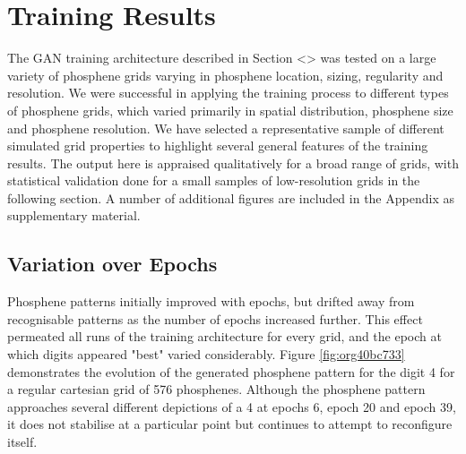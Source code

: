 \documentclass[a4paper,11pt,openany]{book}
\begin{document}
\chapter{Training Results}
\label{sec:org4732778}

The GAN training architecture described in Section <> was tested on a large variety of phosphene grids varying in phosphene location, sizing, regularity and resolution.
We were successful in applying the training process to different types of phosphene grids, which varied primarily in spatial distribution, phosphene size and phosphene resolution.
We have selected a representative sample of different simulated grid properties to highlight several general features of the training results.
The output here is appraised qualitatively for a broad range of grids, with statistical validation done for a small samples of low-resolution grids in the following section.
A number of additional figures are included in the Appendix as supplementary material.

\section*{Variation over Epochs}
\label{sec:orge37288a}

Phosphene patterns initially improved with epochs, but drifted away from recognisable patterns as the number of epochs increased further.
This effect permeated all runs of the training architecture for every grid, and the epoch at which digits appeared "best" varied considerably.
Figure \ref{fig:org40bc733} demonstrates the evolution of the generated phosphene pattern for the digit 4 for a regular cartesian grid of 576 phosphenes.
Although the phosphene pattern approaches several different depictions of a 4 at epochs 6, epoch 20 and epoch 39, it does not stabilise at a particular point but continues to attempt to reconfigure itself.
\end{document}
